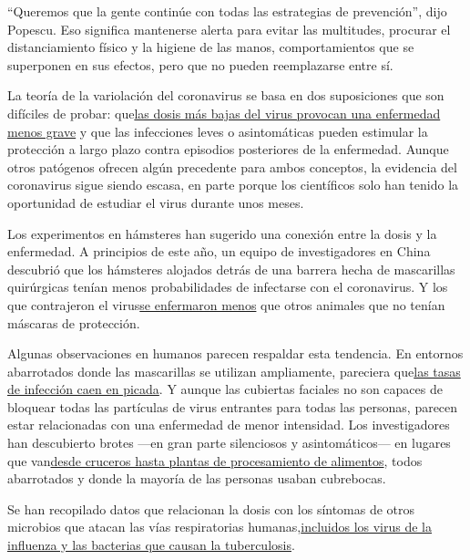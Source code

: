 ``Queremos que la gente continúe con todas las estrategias de
prevención'', dijo Popescu. Eso significa mantenerse alerta para evitar
las multitudes, procurar el distanciamiento físico y la higiene de las
manos, comportamientos que se superponen en sus efectos, pero que no
pueden reemplazarse entre sí.

La teoría de la variolación del coronavirus se basa en dos suposiciones
que son difíciles de probar:
que\href{https://link.springer.com/article/10.1007/s11606-020-06067-8}{las
dosis más bajas del virus provocan una enfermedad menos grave} y que las
infecciones leves o asintomáticas pueden estimular la protección a largo
plazo contra episodios posteriores de la enfermedad. Aunque otros
patógenos ofrecen algún precedente para ambos conceptos, la evidencia
del coronavirus sigue siendo escasa, en parte porque los científicos
solo han tenido la oportunidad de estudiar el virus durante unos meses.

Los experimentos en hámsteres han sugerido una conexión entre la dosis y
la enfermedad. A principios de este año, un equipo de investigadores en
China descubrió que los hámsteres alojados detrás de una barrera hecha
de mascarillas quirúrgicas tenían menos probabilidades de infectarse con
el coronavirus. Y los que contrajeron el
virus\href{https://academic.oup.com/cid/advance-article/doi/10.1093/cid/ciaa644/5848814}{se
enfermaron menos} que otros animales que no tenían máscaras de
protección.

Algunas observaciones en humanos parecen respaldar esta tendencia. En
entornos abarrotados donde las mascarillas se utilizan ampliamente,
pareciera
que\href{https://www.nytimes3xbfgragh.onion/2020/07/14/health/coronavirus-hair-salon-masks.html}{las
tasas de infección caen en picada}. Y aunque las cubiertas faciales no
son capaces de bloquear todas las partículas de virus entrantes para
todas las personas, parecen estar relacionadas con una enfermedad de
menor intensidad. Los investigadores han descubierto brotes ---en gran
parte silenciosos y asintomáticos--- en lugares que
van\href{https://www.nytimes3xbfgragh.onion/2020/07/27/health/coronavirus-mask-protection.html}{desde
cruceros hasta plantas de procesamiento de alimentos}, todos abarrotados
y donde la mayoría de las personas usaban cubrebocas.

Se han recopilado datos que relacionan la dosis con los síntomas de
otros microbios que atacan las vías respiratorias
humanas,\href{https://www.thelancet.com/journals/lanres/article/PIIS2213-2600(20)30323-4/fulltext}{incluidos
los virus de la influenza y las bacterias que causan la tuberculosis}.

